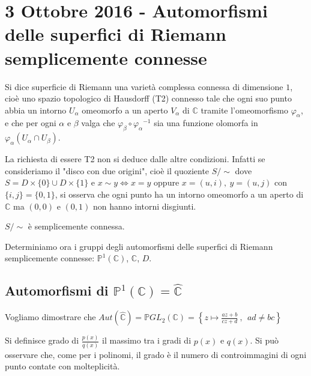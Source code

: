 \chapter{3 Ottobre 2016 - Automorfismi delle superfici di Riemann semplicemente connesse}
\justify

\begin{definizione}
Si dice superficie di Riemann una varietà complessa connessa di dimensione $1$, cioè uno spazio topologico di Hausdorff (T2)
connesso tale che ogni suo punto abbia un intorno $U_\alpha$ omeomorfo a un aperto $V_\alpha$ di $\mathbb{C}$
tramite l'omeomorfismo $\varphi_\alpha$, e che per ogni $\alpha$ e $\beta$ valga che $\varphi_\beta \circ {\varphi_\alpha}^{-1}$
sia una funzione olomorfa in $\varphi_\alpha \left( U_\alpha \cap U_\beta \right)$.
\end{definizione}

\begin{osservazione}
La richiesta di essere T2 non si deduce dalle altre condizioni. Infatti se consideriamo il "disco con due origini",
cioè il quoziente $S/\!\!\sim$ dove $S=D\times\{0\} \cup D\times\{1\}$ e $x\sim y \Longleftrightarrow x=y$ oppure $x=(u,i),\ y=(u,j)$ con $\{i,j\}=\{0,1\}$,
si osserva che ogni punto ha un intorno omeomorfo a un aperto di $\mathbb{C}$ ma $(0,0)$ e $(0,1)$ non hanno intorni disgiunti.
\end{osservazione}

\begin{esercizio}
$S/\!\!\sim$ è semplicemente connessa.
\end{esercizio}

Determiniamo ora i gruppi degli automorfismi delle superfici di Riemann semplicemente
connesse: $\mathbb{P}^1(\mathbb{C})$, $\mathbb{C}$, $D$.


\section{Automorfismi di $\mathbb{P}^1(\mathbb{C})=\hat{\mathbb{C}}$}
Vogliamo dimostrare che $Aut( \hat{\mathbb{C}} )= \mathbb{P}GL_2 (\mathbb{C} )=\left\{z\mapsto \displaystyle{\frac{az+b}{cz+d}} \ ,\ \  ad\neq bc\right\}$

\begin{definizione}
Si definisce grado di $\frac{p(x)}{q(x)}$ il massimo tra i gradi di $p(x)$ e $q(x)$.
Si può osservare che, come per i polinomi, il grado è il numero di controimmagini di ogni punto contate con molteplicità.
\end{definizione}

